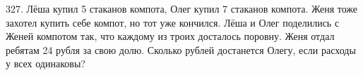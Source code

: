 327. Лёша купил 5 стаканов компота, Олег купил 7 стаканов компота. Женя тоже захотел купить себе компот, но тот уже кончился. Лёша и Олег поделились с Женей компотом так, что каждому из троих досталось поровну. Женя отдал ребятам 24 рубля за свою долю. Сколько рублей достанется Олегу, если расходы у всех одинаковы?\\
